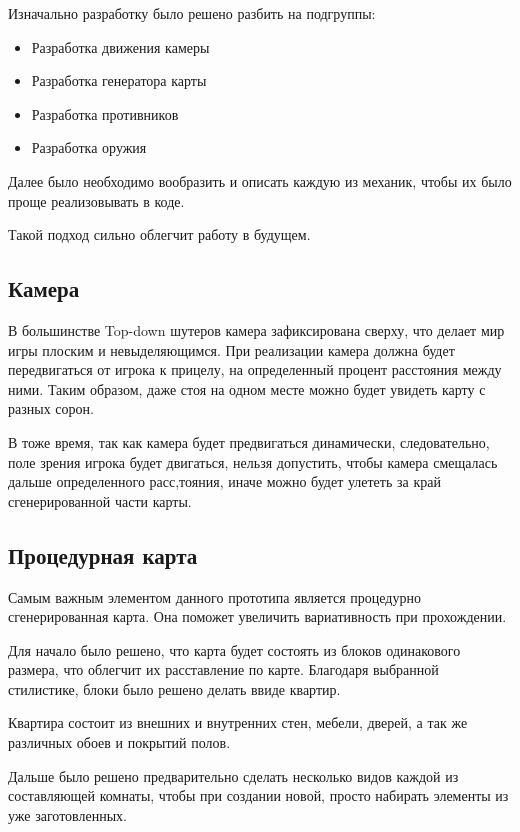 \documentclass[14pt, titlepage,fleqn,a4paper]{extarticle}
\begin{document}
	Изначально разработку было решено разбить на подгруппы:
	\begin{itemize}
	\item Разработка движения камеры
	\item Разработка генератора карты
	\item Разработка противников
	\item Разработка оружия
	\end{itemize}
	
	Далее было необходимо вообразить и описать каждую из механик, чтобы их было проще реализовывать в коде.
	
	Такой подход сильно облегчит работу в будущем.
	
	\subsection*{Камера}
	
	В большинстве Top-down шутеров камера зафиксирована сверху, что делает мир игры плоским и невыделяющимся. При реализации камера должна будет передвигаться от игрока к прицелу, на определенный процент расстояния между ними. Таким образом, даже стоя на одном месте можно будет увидеть карту с разных сорон.
	
	В тоже время, так как камера будет предвигаться динамически, следовательно, поле зрения игрока будет двигаться, нельзя допустить, чтобы камера смещалась дальше определенного расс,тояния, иначе можно будет улететь за край сгенерированной части карты.
	
	\subsection*{Процедурная карта}
	
	Самым важным элементом данного прототипа является процедурно сгенерированная карта. Она поможет увеличить вариативность при прохождении.
	
	Для начало было решено, что карта будет состоять из блоков одинакового размера, что облегчит их расставление по карте. Благодаря выбранной стилистике, блоки было решено делать ввиде квартир.
	
	Квартира состоит из внешних и внутренних стен, мебели, дверей, а так же различных обоев и покрытий полов.
	
	Дальше было решено предварительно сделать несколько видов каждой из составляющей комнаты, чтобы при создании новой, просто набирать элементы из уже заготовленных.
	
\end{document}
